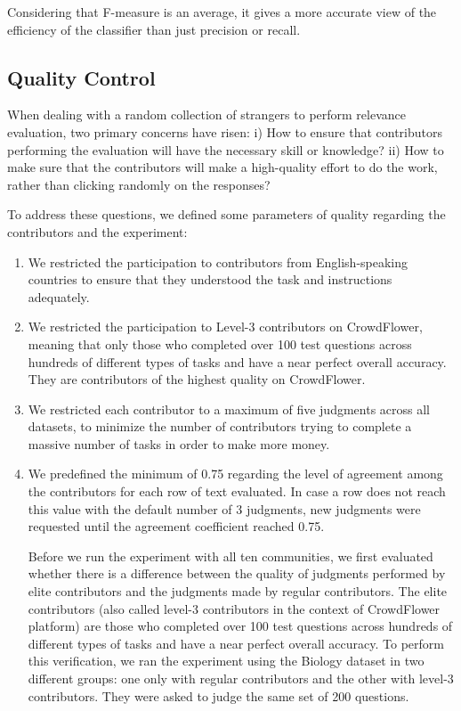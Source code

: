 Considering that F-measure is an average, it gives a more accurate view of the efficiency of the classifier than just precision or recall.

\subsection{\hspace*{3pt} Quality Control}

When dealing with a random collection of strangers to perform relevance evaluation, two primary concerns have risen:  i) How to ensure that contributors performing the evaluation will have the necessary skill or knowledge? ii) How to make sure that the contributors will make a high-quality effort to do the work, rather than clicking randomly on the responses?


To address these questions, we defined some parameters of quality regarding the contributors and the experiment:

\begin{enumerate}

\item We restricted the participation to contributors from English-speaking countries to ensure that they understood the task and instructions adequately. 

\item We restricted the participation to Level-3 contributors on CrowdFlower, meaning that only those who completed over 100 test questions across hundreds of different types of tasks and have a near perfect overall accuracy. They are contributors of the highest quality on CrowdFlower.

\item We restricted each contributor to a maximum of five judgments across all datasets, to minimize the number of contributors trying to complete a massive number of tasks in order to make more money.

\item We predefined the minimum of 0.75 regarding the level of agreement among the contributors for each row of text evaluated. In case a row does not reach this value with the default number of 3 judgments, new judgments were requested until the agreement coefficient reached 0.75.

Before we run the experiment with all ten communities, we first evaluated whether there is a difference between the quality of judgments performed by elite contributors and the judgments made by regular contributors. The elite contributors (also called level-3 contributors in the context of CrowdFlower platform) are those who completed over 100 test questions across hundreds of different types of tasks and have a near perfect overall accuracy. To perform this verification, we ran the experiment using the Biology dataset in two different groups: one only with regular contributors and the other with level-3 contributors. They were asked to judge the same set of 200 questions. 

\end{enumerate}

